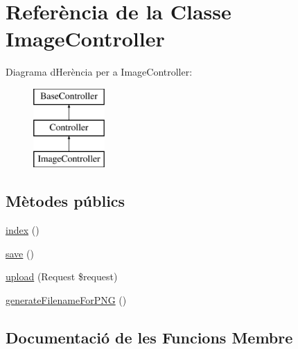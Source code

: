 \hypertarget{class_app_1_1_http_1_1_controllers_1_1_image_controller}{}\section{Referència de la Classe Image\+Controller}
\label{class_app_1_1_http_1_1_controllers_1_1_image_controller}
Diagrama d\textquotesingle{}Herència per a Image\+Controller\+:\begin{figure}[H]
\begin{center}
\leavevmode
\includegraphics[height=3.000000cm]{class_app_1_1_http_1_1_controllers_1_1_image_controller}
\end{center}
\end{figure}
\subsection*{Mètodes públics}
\begin{DoxyCompactItemize}
\item 
\mbox{\hyperlink{class_app_1_1_http_1_1_controllers_1_1_image_controller_a149eb92716c1084a935e04a8d95f7347}{index}} ()
\item 
\mbox{\hyperlink{class_app_1_1_http_1_1_controllers_1_1_image_controller_afc8a3c62679cf00ade9f15fb2a6d6132}{save}} ()
\item 
\mbox{\hyperlink{class_app_1_1_http_1_1_controllers_1_1_image_controller_abc332ce722c8ad0e5e856fb246d68495}{upload}} (Request \$request)
\item 
\mbox{\hyperlink{class_app_1_1_http_1_1_controllers_1_1_image_controller_a7ed73da32ee3c34907b2124fe3a4e613}{generate\+Filename\+For\+P\+NG}} ()
\end{DoxyCompactItemize}


\subsection{Documentació de les Funcions Membre}
\mbox{\label{class_app_1_1_http_1_1_controllers_1_1_image_controller_a7ed73da32ee3c34907b2124fe3a4e613}} 
